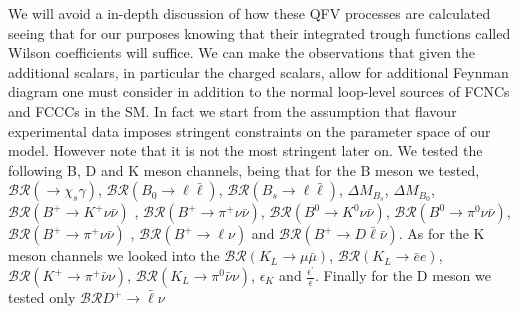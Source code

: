 We will avoid a in-depth discussion of how these QFV processes are calculated seeing that for our purposes knowing that their integrated trough functions called Wilson coefficients will suffice. 
%
We can make the observations that given the additional scalars, in particular the charged scalars, allow for additional Feynman diagram one must consider in addition to the normal loop-level sources of FCNCs and FCCCs in the SM. 
% 
In fact we start from the assumption that flavour experimental data imposes stringent constraints on the parameter space of our model. 
%
However note that it is not the most stringent later on. 
% 
We tested the following B, D and K meson channels, being that for  the B meson we tested, 
$\mathcal{BR} \left( \rightarrow \chi_s \gamma \right)$, 
$\mathcal{BR} \left( B_0 \rightarrow \ell \bar{\ell} \right)$, 
$\mathcal{BR} \left( B_s \rightarrow \ell \bar{\ell} \right)$, 
$\Delta M_{B_s}$, 
$\Delta M_{B_0}$, 
$\mathcal{BR} \left( B^+ \rightarrow K^+\nu\bar{\nu} \right)$ , 
$\mathcal{BR} \left( B^+ \rightarrow \pi^+\nu\bar{\nu} \right)$, 
$\mathcal{BR} \left( B^0 \rightarrow K^0\nu\bar{\nu} \right)$,  
$\mathcal{BR} \left( B^0 \rightarrow \pi^0 \nu\bar{\nu} \right)$, 
$\mathcal{BR} \left( B^+ \rightarrow \pi^+\nu\bar{\nu} \right)$ , 
$\mathcal{BR} \left( B^+ \rightarrow \ell \nu \right)$ and
$\mathcal{BR} \left( B^+ \rightarrow D \bar{\ell} \bar{\nu} \right)$. 
%
As for the K meson channels we looked into the $\mathcal{BR} \left( K_L \rightarrow \mu \bar{\mu} \right)$,  $\mathcal{BR} \left( K_L \rightarrow \bar{e} e \right)$,  $\mathcal{BR} \left( K^+ \rightarrow \pi^+ \bar{\nu} \nu \right)$, $\mathcal{BR} \left( K_L \rightarrow \pi^0 \bar{\nu} \nu \right)$, $\epsilon_K$ and $\frac{\epsilon^\prime}{\epsilon}$. 
%
Finally for the D meson we tested only $\mathcal{BR} D^+ \rightarrow \bar{\ell} \nu$

